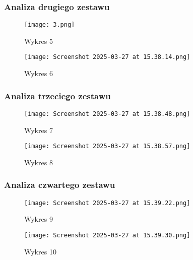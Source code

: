 \documentclass{article}
\begin{document}
\subsubsection{Analiza drugiego zestawu}
\begin{figure}[H]
    \centering
    \begin{minipage}{0.45\textwidth}
        \texttt{[image: 3.png]}
        \caption{Wykres 5}
    \end{minipage}
    \hfill
    \begin{minipage}{0.45\textwidth}
        \texttt{[image: Screenshot 2025-03-27 at 15.38.14.png]}
        \caption{Wykres 6}
    \end{minipage}
\end{figure}

\subsubsection{Analiza trzeciego zestawu}
\begin{figure}[H]
    \centering
    \begin{minipage}{0.45\textwidth}
        \texttt{[image: Screenshot 2025-03-27 at 15.38.48.png]}
        \caption{Wykres 7}
    \end{minipage}
    \hfill
    \begin{minipage}{0.45\textwidth}
        \texttt{[image: Screenshot 2025-03-27 at 15.38.57.png]}
        \caption{Wykres 8}
    \end{minipage}
\end{figure}

\subsubsection{Analiza czwartego zestawu}
\begin{figure}[H]
    \centering
    \begin{minipage}{0.45\textwidth}
        \texttt{[image: Screenshot 2025-03-27 at 15.39.22.png]}
        \caption{Wykres 9}
    \end{minipage}
    \hfill
    \begin{minipage}{0.45\textwidth}
        \texttt{[image: Screenshot 2025-03-27 at 15.39.30.png]}
        \caption{Wykres 10}
    \end{minipage}
\end{figure}
\end{document}
